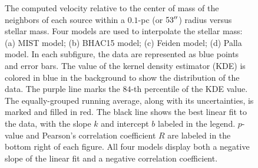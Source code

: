 \documentclass[12pt]{ucsddissertation}
\begin{document}
\begin{CJK*}{UTF8}{gbsn}
\begin{figure}[htb!]
    \centering
    \caption[Relative velocity vs. stellar mass]{The computed velocity relative to the center of mass of the neighbors of each source within a $0.1$-pc (or $53\mbox{$^{\prime\prime}$}$) radius versus stellar mass. Four models are used to interpolate the stellar mass: (a) MIST model; (b) BHAC15 model; (c) Feiden model; (d) Palla model. In each subfigure, the data are represented as blue points and error bars. The value of the kernel density estimator (KDE) is colored in blue in the background to show the distribution of the data. The purple line marks the $84$-th percentile of the KDE value. The equally-grouped running average, along with its uncertainties, is marked and filled in red. The black line shows the best linear fit to the data, with the slope $k$ and intercept $b$ labeled in the legend. $p$-value and Pearson's correlation coefficient $R$ are labeled in the bottom right of each figure. All four models display both a negative slope of the linear fit and a negative correlation coefficient.}
    \label{fig:vrel-mass}
\end{figure}



\end{CJK*}
\end{document}
